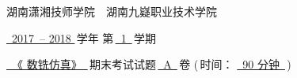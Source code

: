 \documentclass[12pt,twocolumn,landscape,UTF8,twoside]{ctexart}
\author{高星}
\begin{document}
\noindent	
	
\begin{spacing}{1.5}
		\begin{center}
			 \heiti 
				湖南潇湘技师学院~~湖南九嶷职业技术学院
				
				\underline{~2017~-- 2018 }\,学年 \hspace{1cm} 第\,\underline{~1~}\,学期
				
				\underline{~《 数铣仿真》~}\,期末考试试题\,\underline{~A~}\,卷 (\,时间： \underline{~90 分钟~}\,)
\end{center}
\end{spacing}
\end{document}
